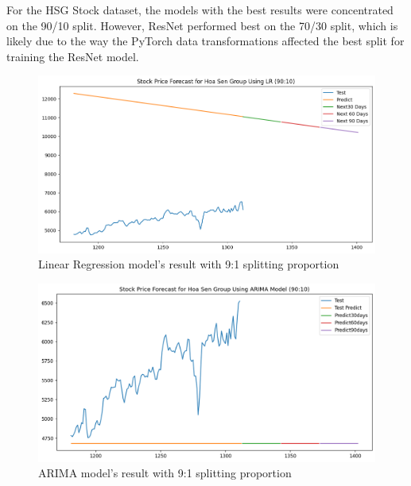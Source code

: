 \documentclass{ieeeojies}
\begin{document}
For the HSG Stock dataset, the models with the best results were concentrated on the 90/10 split. However, ResNet performed best on the 70/30 split, which is likely due to the way the PyTorch data transformations affected the best split for training the ResNet model.
\begin{figure}[H]
  \centering
  \begin{minipage}{0.8\linewidth}
    \centering
    \includegraphics[width=\linewidth]{bibliography/LN_HSG_90-10.png}
    \caption{Linear Regression model's result with 9:1 splitting proportion}
    \label{fig15}
  \end{minipage}
\end{figure}
\begin{figure}[H]
  \centering
  \begin{minipage}{0.8\linewidth}
    \centering
    \includegraphics[width=\linewidth]{bibliography/ARIMA_HSG_90-10.png}
    \caption{ARIMA model's result with 9:1 splitting proportion}
    \label{fig16}
  \end{minipage}
\end{figure}
\end{document}
